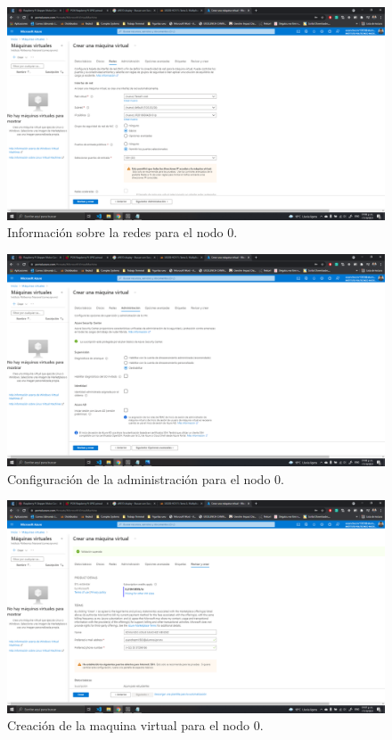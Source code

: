 \documentclass[11pt]{article}
\begin{document}
		\begin{figure}[H]
			\centering
			\includegraphics[scale=0.34]{resources/datosredes.png}
			\caption{Información sobre la redes para el nodo 0. }\label{fig:picture}
		\end{figure}
		\begin{figure}[H]
			\centering
			\includegraphics[scale=0.34]{resources/datosadministracion.png}
			\caption{Configuración de la administración para el nodo 0. }\label{fig:picture}
		\end{figure}
		\begin{figure}[H]
			\centering
			\includegraphics[scale=0.34]{resources/revisarycrear.png}
			\caption{Creación de la maquina virtual para el nodo 0. }\label{fig:picture}
		\end{figure}
\end{document}
